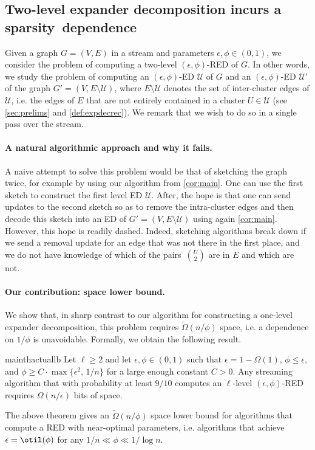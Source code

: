\subsection{Two-level expander decomposition incurs a sparsity~dependence}
\label{sec:techoverviewlb}
Given a graph $G=(V,E)$ in a stream and parameters $\epsilon,\phi \in (0,1)$, we consider the problem of computing a two-level $(\epsilon,\phi)$-RED of $G$. In other words, we study the problem of computing an $(\epsilon,\phi)$-ED $\mathcal{U}$ of $G$ and an $(\epsilon,\phi)$-ED $\mathcal{U'}$ of the graph $G'=(V,E\setminus \mathcal{U})$, where $E\setminus \mathcal{U}$ denotes the set of inter-cluster edges of $\mathcal{U}$, i.e. the edges of $E$ that are not entirely contained in a cluster $U \in \mathcal{U}$ (see \cref{sec:prelims} and \cref{def:expdecrec}). We remark that we wish to do so in a single pass over the stream.

\paragraph*{A natural algorithmic approach and why it fails.} A naive attempt to solve this problem would be that of sketching the graph twice, for example by using our algorithm from \cref{cor:main}. One can use the first sketch to construct the first level ED $\mathcal{U}$. After, the hope is that one can send updates to the second sketch so as to remove the intra-cluster edges and then decode this sketch into an ED of $G'=(V,E\setminus \mathcal{U})$ using again \cref{cor:main}. However, this hope is readily dashed. Indeed, sketching algorithms break down if we send a removal update for an edge that was not there in the first place, and we do not have knowledge of which of the pairs~$\binom{U}{2}$ are in $E$ and which are not.

\paragraph*{Our contribution: space lower bound.} We show that, in sharp contrast to our algorithm for constructing a one-level expander decomposition, this problem requires $\widetilde{\Omega}(n/\phi)$ space, i.e. a dependence on $1/\phi$ is unavoidable. Formally, we obtain the following result.

\begin{restatable}{mainthactual}{lb}
	\label{th:lb}
	Let $\ell \ge 2$ and let $\epsilon, \phi \in (0,1)$ such that $ \epsilon = 1-\Omega(1)$, $\phi \le \epsilon$, and $\phi \ge C \cdot\max\{\epsilon^2 , \, 1/n\}$ for a large enough constant $C > 0$. Any  streaming algorithm that with probability at least $9/10$ computes  an $\ell$-level $(\epsilon,\phi)$-RED requires {$\Omega(n/\epsilon)$} bits of space.
\end{restatable}
\noindent
The above theorem gives an $\widetilde{\Omega}(n/\phi)$ space lower bound for algorithms that compute a RED with near-optimal parameters, i.e. algorithms that achieve $\epsilon =\otil(\phi)$ for any $1/n \ll \phi \ll 1/\log n$.

